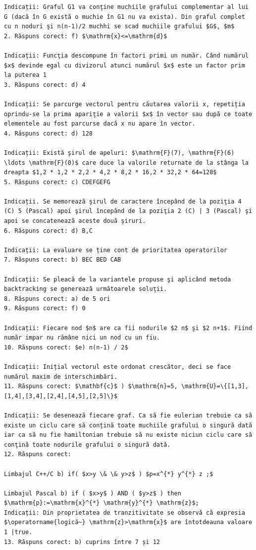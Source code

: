 \documentclass[10pt]{article}
\begin{document}
\begin{verbatim}
Indicații: Graful G1 va conţine muchiile grafului complementar al lui G (dacă în G există o muchie în G1 nu va exista). Din graful complet cu n noduri şi n(n-1)/2 muchhi se scad muchiile grafului $G$, $m$
2. Răspuns corect: f) $\mathrm{x}<=\mathrm{d}$

Indicații: Funcţia descompune în factori primi un număr. Când numărul $x$ devinde egal cu divizorul atunci numărul $x$ este un factor prim la puterea 1
3. Răspuns corect: d) 4

Indicații: Se parcurge vectorul pentru căutarea valorii x, repetiția oprindu-se la prima apariţie a valorii $x$ în vector sau după ce toate elementele au fost parcurse dacă x nu apare în vector.
4. Răspuns corect: d) 128

Indicații: Există şirul de apeluri: $\mathrm{F}(7), \mathrm{F}(6) \ldots \mathrm{F}(0)$ care duce la valorile returnate de la stânga la dreapta $1,2 * 1,2 * 2,2 * 4,2 * 8,2 * 16,2 * 32,2 * 64=128$
5. Răspuns corect: c) CDEFGEFG

Indicații. Se memorează şirul de caractere începând de la poziţia 4 (C) 5 (Pascal) apoi şirul începând de la poziţia 2 (C) | 3 (Pascal) şi apoi se concatenează aceste două şiruri.
6. Răspuns corect: d) B,C

Indicații: La evaluare se ține cont de prioritatea operatorilor
7. Răspuns corect: b) BEC BED CAB

Indicații: Se pleacă de la variantele propuse şi aplicând metoda backtracking se generează următoarele soluţii.
8. Răspuns corect: a) de 5 ori
9. Răspuns corect: f) 0

Indicații: Fiecare nod $n$ are ca fii nodurile $2 n$ şi $2 n+1$. Fiind număr impar nu rămâne nici un nod cu un fiu.
10. Răspuns corect: $e) n(n-1) / 2$

Indicații: Inițial vectorul este ordonat crescător, deci se face numărul maxim de interschimbări.
11. Răspuns corect: $\mathbf{c}$ ) $\mathrm{n}=5, \mathrm{U}=\{[1,3],[1,4],[3,4],[2,4],[4,5],[2,5]\}$

Indicații: Se desenează fiecare graf. Ca să fie eulerian trebuie ca să existe un ciclu care să conțină toate muchiile grafului o singură dată iar ca să nu fie hamiltonian trebuie să nu existe niciun ciclu care să conţină toate nodurile grafului o singură dată.
12. Răspuns corect:

Limbajul C++/C b) if( $x>y \& \& y>z$ ) $p=x^{*} y^{*} z ;$

Limbajul Pascal b) if ( $x>y$ ) AND ( $y>z$ ) then $\mathrm{p}:=\mathrm{x}^{*} \mathrm{y}^{*} \mathrm{z}$;
Indicații: Din proprietatea de tranzitivitate se observă că expresia $\operatorname{logică~} \mathrm{z}>\mathrm{x}$ are întotdeauna valoare 1 |true.
13. Răspuns corect: b) cuprins între 7 și 12


\end{verbatim}
\end{document}
